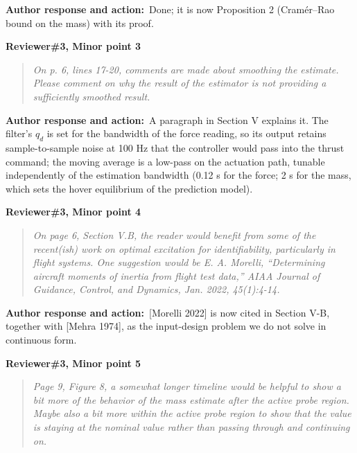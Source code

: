 \documentclass[11pt]{article}
\newcommand{\concern}[1]{\par\medskip\noindent\colorbox{gray!12}{\parbox{\dimexpr\linewidth-2\fboxsep}{\textbf{#1}}}\par\smallskip}
\newcommand{\rlabel}[1]{\par\textbf{#1}\ }
\begin{document}
\rlabel{Author response and action:}Done; it is now Proposition 2 (Cram\'er--Rao bound on the mass) with its proof.

\concern{Reviewer\#3, Minor point 3}

\begin{quote}\itshape On p. 6, lines 17-20, comments are made about smoothing the estimate. Please comment on why the result of the estimator is not providing a sufficiently smoothed result.\end{quote}

\rlabel{Author response and action:}A paragraph in Section V explains it. The filter's $q_d$ is set for the bandwidth of the force reading, so its output retains sample-to-sample noise at 100 Hz that the controller would pass into the thrust command; the moving average is a low-pass on the actuation path, tunable independently of the estimation bandwidth (0.12 s for the force; 2 s for the mass, which sets the hover equilibrium of the prediction model).

\concern{Reviewer\#3, Minor point 4}

\begin{quote}\itshape On page 6, Section V.B, the reader would benefit from some of the recent(ish) work on optimal excitation for identifiability, particularly in flight systems. One suggestion would be E. A. Morelli, ``Determining aircraft moments of inertia from flight test data,'' AIAA Journal of Guidance, Control, and Dynamics, Jan. 2022, 45(1):4-14.\end{quote}

\rlabel{Author response and action:}[Morelli 2022] is now cited in Section V-B, together with [Mehra 1974], as the input-design problem we do not solve in continuous form.

\concern{Reviewer\#3, Minor point 5}

\begin{quote}\itshape Page 9, Figure 8, a somewhat longer timeline would be helpful to show a bit more of the behavior of the mass estimate after the active probe region. Maybe also a bit more within the active probe region to show that the value is staying at the nominal value rather than passing through and continuing on.\end{quote}
\end{document}
